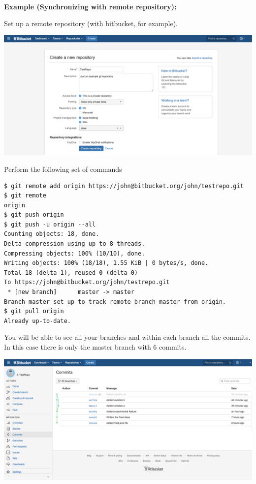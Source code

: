 \documentclass{article}
\begin{document}
\textbf{Example (Synchronizing with remote repository):}

Set up a remote repository (with bitbucket, for example).
\begin{center}
\includegraphics[scale=0.33]{figures/s1.png}
\end{center}

Perform the following set of commands
\begin{lstlisting}
$ git remote add origin https://john@bitbucket.org/john/testrepo.git
$ git remote
origin
$ git push origin
$ git push -u origin --all
Counting objects: 18, done.
Delta compression using up to 8 threads.
Compressing objects: 100% (10/10), done.
Writing objects: 100% (18/18), 1.55 KiB | 0 bytes/s, done.
Total 18 (delta 1), reused 0 (delta 0)
To https://john@bitbucket.org/john/testrepo.git
 * [new branch]      master -> master
Branch master set up to track remote branch master from origin.
$ git pull origin
Already up-to-date.
\end{lstlisting}

You will be able to see all your branches and within each branch all
the commits. In this case there is only the master branch with 6 commits.
\begin{center}
\includegraphics[scale=0.33]{figures/s2.png}
\end{center}
\end{document}
